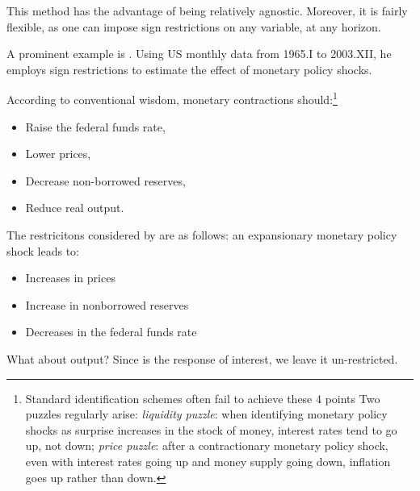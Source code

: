 \documentclass[
]{book}
\providecommand{\tightlist}{%
  \setlength{\itemsep}{0pt}\setlength{\parskip}{0pt}}
\theoremstyle{definition}
\theoremstyle{definition}
\theoremstyle{definition}
\theoremstyle{definition}
\theoremstyle{remark}
\begin{document}
This method has the advantage of being relatively agnostic. Moreover, it is fairly flexible, as one can impose sign restrictions on any variable, at any horizon.

A prominent example is \citet{Uhlig_2005}. Using US monthly data from 1965.I to 2003.XII, he employs sign restrictions to estimate the effect of monetary policy shocks.

According to conventional wisdom, monetary contractions should:\footnote{Standard identification schemes often fail to achieve these 4 points Two puzzles regularly arise: \emph{liquidity puzzle}: when identifying monetary policy shocks as surprise increases in the stock of money, interest rates tend to go up, not down; \emph{price puzzle}: after a contractionary monetary policy shock, even with interest rates going up and money supply going down, inflation goes up rather than down.}

\begin{itemize}
\tightlist
\item
  Raise the federal funds rate,
\item
  Lower prices,
\item
  Decrease non-borrowed reserves,
\item
  Reduce real output.
\end{itemize}

The restricitons considered by \citet{Uhlig_2005} are as follows: an expansionary monetary policy shock leads to:

\begin{itemize}
\tightlist
\item
  Increases in prices
\item
  Increase in nonborrowed reserves
\item
  Decreases in the federal funds rate
\end{itemize}

What about output? Since is the response of interest, we leave it un-restricted.
\end{document}
